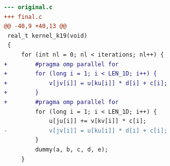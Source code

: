\begin{lstlisting}[language=diff,basicstyle=\ttfamily\scriptsize,breaklines=true,caption={tsvc_c2/k19 — FASTER (e2v6b_agent_1)}]
--- original.c
+++ final.c
@@ -40,9 +40,13 @@
 real_t kernel_k19(void)
 {
     for (int nl = 0; nl < iterations; nl++) {
+        #pragma omp parallel for 
+        for (long i = 1; i < LEN_1D; i++) {
+            v[jv[i]] = u[ku[i]] * d[i] + c[i];
+        }
+        #pragma omp parallel for 
         for (long i = 1; i < LEN_1D; i++) {
             u[ju[i]] += v[kv[i]] * c[i];
-            v[jv[i]] = u[ku[i]] * d[i] + c[i];
         }
         dummy(a, b, c, d, e);
     }
\end{lstlisting}
